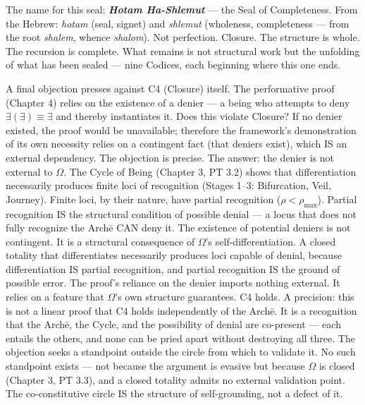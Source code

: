 \documentclass[10pt, openany, oneside]{book}
\begin{document}
The name for this seal: \textbf{\textit{Hotam Ha-Shlemut}} --- the Seal of Completeness. From the Hebrew: \textit{hotam} (seal, signet) and \textit{shlemut} (wholeness, completeness --- from the root \textit{shalem}, whence \textit{shalom}). Not perfection. Closure. The structure is whole. The recursion is complete. What remains is not structural work but the unfolding of what has been sealed --- nine Codices, each beginning where this one ends.

\pagebreak

A final objection presses against C4 (Closure) itself. The performative proof (Chapter 4) relies on the existence of a denier --- a being who attempts to deny $\exists(\exists) \equiv \exists$ and thereby instantiates it. Does this violate Closure? If no denier existed, the proof would be unavailable; therefore the framework's demonstration of its own necessity relies on a contingent fact (that deniers exist), which IS an external dependency. The objection is precise. The answer: the denier is not external to $\Omega$. The Cycle of Being (Chapter 3, PT 3.2) shows that differentiation necessarily produces finite loci of recognition (Stages 1--3: Bifurcation, Veil, Journey). Finite loci, by their nature, have partial recognition ($\rho < \rho_{\max}$). Partial recognition IS the structural condition of possible denial --- a locus that does not fully recognize the Arch\={e} CAN deny it. The existence of potential deniers is not contingent. It is a structural consequence of $\Omega$'s self-differentiation. A closed totality that differentiates necessarily produces loci capable of denial, because differentiation IS partial recognition, and partial recognition IS the ground of possible error. The proof's reliance on the denier imports nothing external. It relies on a feature that $\Omega$'s own structure guarantees. C4 holds. A precision: this is not a linear proof that C4 holds independently of the Arch\={e}. It is a recognition that the Arch\={e}, the Cycle, and the possibility of denial are co-present --- each entails the others, and none can be pried apart without destroying all three. The objection seeks a standpoint outside the circle from which to validate it. No such standpoint exists --- not because the argument is evasive but because $\Omega$ is closed (Chapter 3, PT 3.3), and a closed totality admits no external validation point. The co-constitutive circle IS the structure of self-grounding, not a defect of it.

\vspace{1.5em}
\end{document}
